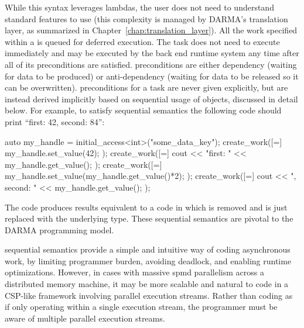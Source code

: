 While this syntax leverages  \glspl{lambda}, the user does not need to
understand  standard features to use  (this
complexity is managed by \gls{DARMA}'s \gls{translation layer}, as summarized in Chapter~\ref{chap:translation_layer}). 
All the work specified within a  is queued for
\gls{deferred execution}.  The \gls{task} does not need to execute immediately 
and may be executed by the \gls{back end} \gls{runtime system} any time after
all of its \glspl{precondition} are satisfied. 
\Glspl{precondition} are either \gls{dependency} (waiting for data to be produced) or
\gls{anti-dependency} (waiting for data to be released so it can be overwritten).   
\Glspl{precondition} for a \gls{task} are never given explicitly, but are instead derived 
implicitly based on sequential usage of  objects, discussed in detail below.
For example, to satisfy \gls{sequential semantics} the following code should print ``first: 42, second: 84'':
\begin{CppCode}
auto my_handle = initial_access<int>("some_data_key");
create_work([=]{
  my_handle.set_value(42);
});
create_work([=]{
  cout << "first: " << my_handle.get_value();
});
create_work([=]{
  my_handle.set_value(my_handle.get_value()*2);
});
create_work([=]{
  cout << ", second: " << my_handle.get_value();
});
\end{CppCode}
The code produces results equivalent to a \CC{} code in which  
is removed and  is just replaced with the underlying type.
These \gls{sequential semantics} are pivotal to the \gls{DARMA}
\gls{programming model}.

\Gls{sequential semantics} provide a simple and intuitive way of coding
asynchronous work, by limiting programmer burden, avoiding deadlock,
and enabling runtime optimizations.
However, in cases with massive \gls{spmd} parallelism across a distributed memory machine,
it may be more scalable and natural to code in a \gls{CSP}-like framework
involving parallel \glspl{execution stream}.
Rather than coding as if only operating within a single \gls{execution stream}, 
the programmer must be aware of multiple parallel \glspl{execution stream}.

